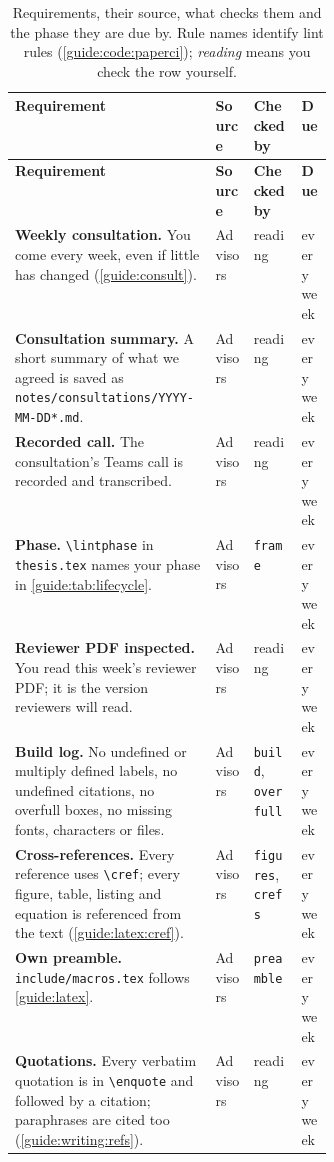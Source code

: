 {\small
\begin{xltabular}{\linewidth}{X >{\raggedright\arraybackslash}p{0.12\linewidth} >{\raggedright\arraybackslash}p{0.15\linewidth} >{\raggedright\arraybackslash}p{0.1\linewidth}}
  \caption{Requirements, their source, what checks them and the phase they are due by. Rule names identify lint rules (\cref{guide:code:paperci}); \emph{reading} means you check the row yourself.}\label{guide:tab:polish}\\
  \toprule \textbf{Requirement} & \textbf{Source} & \textbf{Checked by} & \textbf{Due} \\ \midrule \endfirsthead
  \toprule \textbf{Requirement} & \textbf{Source} & \textbf{Checked by} & \textbf{Due} \\ \midrule \endhead
  \bottomrule \endlastfoot
  \textbf{Weekly consultation.} You come every week, even if little has changed (\cref{guide:consult}). & Advisors & reading & every week \\
  \textbf{Consultation summary.} A short summary of what we agreed is saved as \texttt{notes/consultations/YYYY-MM-DD*.md}. & Advisors & reading & every week \\
  \textbf{Recorded call.} The consultation's Teams call is recorded and transcribed. & Advisors & reading & every week \\
  \textbf{Phase.} \texttt{\textbackslash lintphase} in \texttt{thesis.tex} names your phase in \cref{guide:tab:lifecycle}. & Advisors & \texttt{frame} & every week \\
  \textbf{Reviewer PDF inspected.} You read this week's reviewer PDF; it is the version reviewers will read. & Advisors & reading & every week \\
  \textbf{Build log.} No undefined or multiply defined labels, no undefined citations, no overfull boxes, no missing fonts, characters or files. & Advisors & \texttt{build}, \texttt{overfull} & every week \\
  \textbf{Cross-references.} Every reference uses \texttt{\textbackslash cref}; every figure, table, listing and equation is referenced from the text (\cref{guide:latex:cref}). & Advisors & \texttt{figures}, \texttt{crefs} & every week \\
  \textbf{Own preamble.} \texttt{include/macros.tex} follows \cref{guide:latex}. & Advisors & \texttt{preamble} & every week \\
  \textbf{Quotations.} Every verbatim quotation is in \texttt{\textbackslash enquote} and followed by a citation; paraphrases are cited too (\cref{guide:writing:refs}). & Advisors & reading & every week \\

\end{xltabular}}
